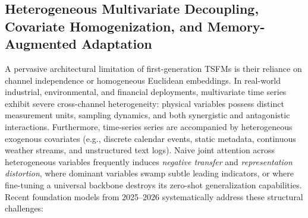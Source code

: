 \subsection{Heterogeneous Multivariate Decoupling, Covariate Homogenization, and Memory-Augmented Adaptation}
\label{sec:heterogeneous_multivariate_memory}

A pervasive architectural limitation of first-generation TSFMs is their reliance on channel independence or homogeneous Euclidean embeddings. In real-world industrial, environmental, and financial deployments, multivariate time series exhibit severe cross-channel heterogeneity: physical variables possess distinct measurement units, sampling dynamics, and both synergistic and antagonistic interactions. Furthermore, time-series series are accompanied by heterogeneous exogenous covariates (e.g., discrete calendar events, static metadata, continuous weather streams, and unstructured text logs). Naive joint attention across heterogeneous variables frequently induces \emph{negative transfer} and \emph{representation distortion}, where dominant variables swamp subtle leading indicators, or where fine-tuning a universal backbone destroys its zero-shot generalization capabilities. Recent foundation models from 2025--2026 systematically address these structural challenges:

